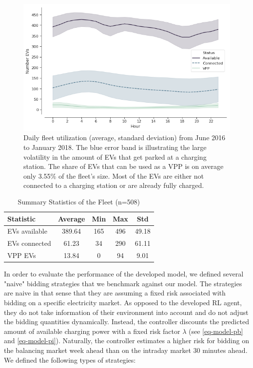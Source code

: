 \documentclass[a4paper, 12pt]{article}
\begin{document}
\begin{figure}[h]
\centering
\includegraphics[width=1\linewidth]{fig/fleet-utilization.png}
\caption[Daily Fleet Utilzation]{Daily fleet utilization (average, standard deviation) from June 2016 to January 2018. The blue error band is illustrating the large volatility in the amount of EVs that get parked at a charging station. The share of EVs that can be used as a VPP is on average only 3.55\% of the fleet's size. Most of the EVs are either not connected to a charging station or are already fully charged. \label{fig-fleet-utilization}}
\end{figure}

\begin{table}[htb]
\caption[Summary Statistics of the Fleet]{Summary Statistics of the Fleet (n=508) \label{table-sim-stats}}
\centering
\begin{tabular}{l|cccc}
\hline
\hline
Statistic & Average & Min & Max & Std\\
\hline
EVs available & 389.64 & 165 & 496 & 49.18\\
EVs connected & 61.23 & 34 & 290 & 61.11\\
VPP EVs & 13.84 & 0 & 94 & 9.01\\
\hline
\hline
\end{tabular}
\end{table}

In order to evaluate the performance of the developed model, we defined several
"naive" bidding strategies that we benchmark against our model. The strategies
are naive in that sense that they are assuming a fixed risk associated with
bidding on a specific electricity market. As opposed to the developed RL agent,
they do not take information of their environment into account and do not adjust
the bidding quantities dynamically. Instead, the controller discounts the
predicted amount of available charging power with a fixed risk factor \(\lambda\)
(see \eqref{eq-model-pb} and \eqref{eq-model-pi}). Naturally, the controller
estimates a higher risk for bidding on the balancing market week ahead than on
the intraday market 30 minutes ahead. We defined the following types of
strategies:
\end{document}
